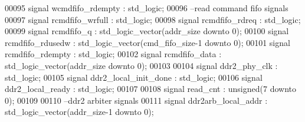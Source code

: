 \begin{DoxyCode}
00095 \textcolor{keywordflow}{signal} \textcolor{vhdlchar}{wcmdfifo_rdempty}             \textcolor{vhdlchar}{:} \textcolor{comment}{std\_logic};
00096 \textcolor{keyword}{--read command fifo signals}
00097 \textcolor{keywordflow}{signal} \textcolor{vhdlchar}{rcmdfifo_wrfull}              \textcolor{vhdlchar}{:} \textcolor{comment}{std\_logic};
00098 \textcolor{keywordflow}{signal} \textcolor{vhdlchar}{rcmdfifo_rdreq}               \textcolor{vhdlchar}{:} \textcolor{comment}{std\_logic}; 
00099 \textcolor{keywordflow}{signal} \textcolor{vhdlchar}{rcmdfifo_q}                       \textcolor{vhdlchar}{:} \textcolor{comment}{std\_logic\_vector}\textcolor{vhdlchar}{(}\textcolor{vhdlchar}{addr_size} \textcolor{keywordflow}{downto} \textcolor{vhdllogic}{}\textcolor{vhdllogic}{0}\textcolor{vhdlchar}{)};
00100 \textcolor{keywordflow}{signal} \textcolor{vhdlchar}{rcmdfifo_rdusedw}             \textcolor{vhdlchar}{:} \textcolor{comment}{std\_logic\_vector}\textcolor{vhdlchar}{(}\textcolor{vhdlchar}{cmd_fifo_size}\textcolor{vhdlchar}{-}\textcolor{vhdllogic}{}\textcolor{vhdllogic}{1} \textcolor{keywordflow}{downto} \textcolor{vhdllogic}{}\textcolor{vhdllogic}{0}\textcolor{vhdlchar}{)};
00101 \textcolor{keywordflow}{signal} \textcolor{vhdlchar}{rcmdfifo_rdempty}             \textcolor{vhdlchar}{:} \textcolor{comment}{std\_logic};
00102 \textcolor{keywordflow}{signal} \textcolor{vhdlchar}{rcmdfifo_data}                \textcolor{vhdlchar}{:} \textcolor{comment}{std\_logic\_vector}\textcolor{vhdlchar}{(}\textcolor{vhdlchar}{addr_size} \textcolor{keywordflow}{downto} \textcolor{vhdllogic}{}\textcolor{vhdllogic}{0}\textcolor{vhdlchar}{)};  
00103 
00104 \textcolor{keywordflow}{signal} \textcolor{vhdlchar}{ddr2_phy_clk}                     \textcolor{vhdlchar}{:} \textcolor{comment}{std\_logic};
00105 \textcolor{keywordflow}{signal} \textcolor{vhdlchar}{ddr2_local_init_done}     \textcolor{vhdlchar}{:} \textcolor{comment}{std\_logic};
00106 \textcolor{keywordflow}{signal} \textcolor{vhdlchar}{ddr2_local_ready}             \textcolor{vhdlchar}{:} \textcolor{comment}{std\_logic};
00107 
00108 \textcolor{keywordflow}{signal} \textcolor{vhdlchar}{read_cnt}                     \textcolor{vhdlchar}{:} \textcolor{comment}{unsigned}\textcolor{vhdlchar}{(}\textcolor{vhdllogic}{}\textcolor{vhdllogic}{7} \textcolor{keywordflow}{downto} \textcolor{vhdllogic}{}\textcolor{vhdllogic}{0}\textcolor{vhdlchar}{)};
00109 
00110 \textcolor{keyword}{--ddr2 arbiter signals}
00111 \textcolor{keywordflow}{signal} \textcolor{vhdlchar}{ddr2arb_local_addr}           \textcolor{vhdlchar}{:} \textcolor{comment}{std\_logic\_vector}\textcolor{vhdlchar}{(}\textcolor{vhdlchar}{addr_size}\textcolor{vhdlchar}{-}\textcolor{vhdllogic}{}\textcolor{vhdllogic}{1} \textcolor{keywordflow}{downto} \textcolor{vhdllogic}{}\textcolor{vhdllogic}{0}\textcolor{vhdlchar}{)};

\end{DoxyCode}
